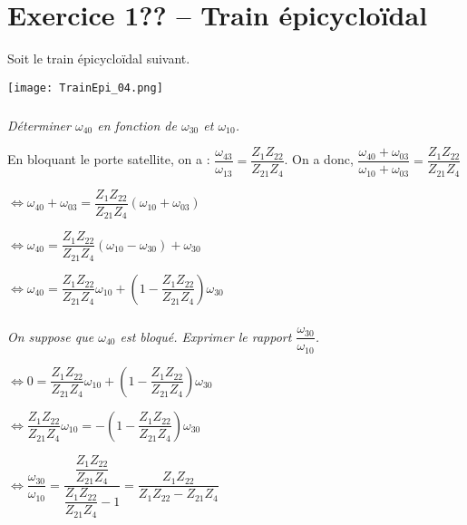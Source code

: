 \section*{Exercice 1?? -- Train épicycloïdal}

\setcounter{exo}{0}

\ifprof
\else
Soit le train épicycloïdal suivant. 

\begin{center}
 \texttt{[image: TrainEpi\_04.png]}
\end{center}
\fi

\ifprof
\newpage
\else
\fi

\subparagraph{}
\textit{Déterminer $\omega_{40}$ en fonction de  $\omega_{30}$ et $\omega_{10}$.}
\ifprof
 \begin{corrige}
 
 En bloquant le porte satellite, on a : $\dfrac{\omega_{43}}{\omega_{13}}=\dfrac{Z_{1}Z_{22}}{Z_{21}Z_{4}}$.
  On a donc, 
  $\dfrac{\omega_{40}+\omega_{03}}{\omega_{10}+\omega_{03}}=
\dfrac{Z_{1}Z_{22}}{Z_{21}Z_{4}}$

  $\Leftrightarrow \omega_{40}+\omega_{03}=\dfrac{Z_{1}Z_{22}}{Z_{21}Z_{4}}\left( \omega_{10}+\omega_{03} \right)$
 
 $\Leftrightarrow \omega_{40}=\dfrac{Z_{1}Z_{22}}{Z_{21}Z_{4}}\left( \omega_{10}-\omega_{30} \right) + \omega_{30}$

 $\Leftrightarrow \omega_{40}=\dfrac{Z_{1}Z_{22}}{Z_{21}Z_{4}}\omega_{10} +\left(1- \dfrac{Z_{1}Z_{22}}{Z_{21}Z_{4}}\right)\omega_{30}$

 \end{corrige}
 \else
 \fi
 
\subparagraph{}
\textit{On suppose que $\omega_{40}$ est bloqué. Exprimer le rapport $\dfrac{\omega_{30}}{\omega_{10}}$.}
\ifprof
 \begin{corrige}
 $\Leftrightarrow 0=\dfrac{Z_{1}Z_{22}}{Z_{21}Z_{4}}\omega_{10} +\left(1- \dfrac{Z_{1}Z_{22}}{Z_{21}Z_{4}}\right)\omega_{30}$

$\Leftrightarrow  \dfrac{Z_{1}Z_{22}}{Z_{21}Z_{4}}\omega_{10} =-\left(1- \dfrac{Z_{1}Z_{22}}{Z_{21}Z_{4}}\right)\omega_{30}$

$\Leftrightarrow  \dfrac{\omega_{30}}{\omega_{10}} = \dfrac{ \dfrac{Z_{1}Z_{22}}{Z_{21}Z_{4}}}{ \dfrac{Z_{1}Z_{22}}{Z_{21}Z_{4}}-1}= \dfrac{ {Z_{1}Z_{22}}}{ {Z_{1}Z_{22}}-Z_{21}Z_{4}}$
 \end{corrige}
 \else
 \fi

